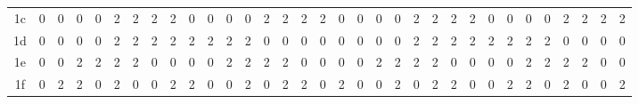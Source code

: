 \documentclass[11pt]{article}
\begin{document}
\begin{table}[htbp]
{\begin{tabular}{c|*{32}{c}}
    1c & 0 & 0 & 0 & 0 & 2 & 2 & 2 & 2 & 0 & 0 & 0 & 0 & 2 & 2 & 2 & 2 & 0 & 0 & 0 & 0 & 2 & 2 & 2 & 2 & 0 & 0 & 0 & 0 & 2 & 2 & 2 & 2 \\
    1d & 0 & 0 & 0 & 0 & 2 & 2 & 2 & 2 & 2 & 2 & 2 & 2 & 0 & 0 & 0 & 0 & 0 & 0 & 0 & 0 & 2 & 2 & 2 & 2 & 2 & 2 & 2 & 2 & 0 & 0 & 0 & 0 \\
    1e & 0 & 0 & 2 & 2 & 2 & 2 & 0 & 0 & 0 & 0 & 2 & 2 & 2 & 2 & 0 & 0 & 0 & 0 & 2 & 2 & 2 & 2 & 0 & 0 & 0 & 0 & 2 & 2 & 2 & 2 & 0 & 0 \\
    1f & 0 & 2 & 2 & 0 & 2 & 0 & 0 & 2 & 2 & 0 & 0 & 2 & 0 & 2 & 2 & 0 & 2 & 0 & 0 & 2 & 0 & 2 & 2 & 0 & 0 & 2 & 2 & 0 & 2 & 0 & 0 & 2 \\
\bottomrule
\end{tabular}
}
\end{table}
\end{document}
